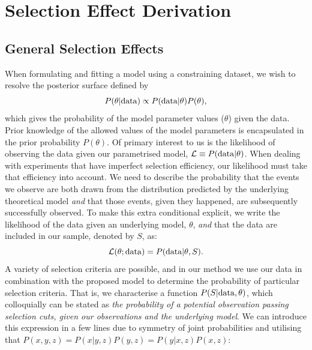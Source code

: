 \documentclass[twocolumn,trackchanges,tighten]{aastex62}
\begin{document}









\appendix

\section{Selection Effect Derivation}
\label{app:selection}

\subsection{General Selection Effects}
\label{app:selection1}
When formulating and fitting a model using a constraining dataset, we wish to resolve the posterior surface defined by
\begin{equation}
P(\theta | {\rm data}) \propto P({\rm data} | \theta) P(\theta),
\end{equation}
which gives the probability of the model parameter values ($\theta$) given the data.  Prior knowledge of the allowed values of the model parameters is encapsulated in the prior probability $P(\theta)$. Of primary interest to us is the likelihood of observing the data given our parametrised model, $\mathcal{L} \equiv P({\rm data} | \theta)$. When dealing with experiments that have imperfect selection efficiency, our likelihood must take that efficiency into account.  We need to describe the probability that the events we observe are both drawn from the distribution predicted by the underlying theoretical model \textit{and} that those events, given they happened, are subsequently successfully observed.  To make this extra conditional explicit, we write the likelihood of the data given an underlying model, $\theta$, \textit{and} that the data are included in our sample, denoted by $S$, as:
\begin{equation}
\mathcal{L}(\theta; {\rm data}) = P({\rm data} | \theta, S). \label{eq:app_like}
\end{equation}
A variety of selection criteria are possible, and in our method we use our data in combination with the proposed model to determine the probability of particular selection criteria.  That is, we characterise a function $P(S|{\rm data},\theta)$, which colloquially can be stated as \textit{the probability of a potential observation passing selection cuts, given our observations and the underlying model}. We can introduce this expression in a few lines due to symmetry of joint probabilities and utilising that $P(x,y,z) = P(x|y,z)P(y,z) = P(y|x, z)P(x, z)$:
\end{document}
